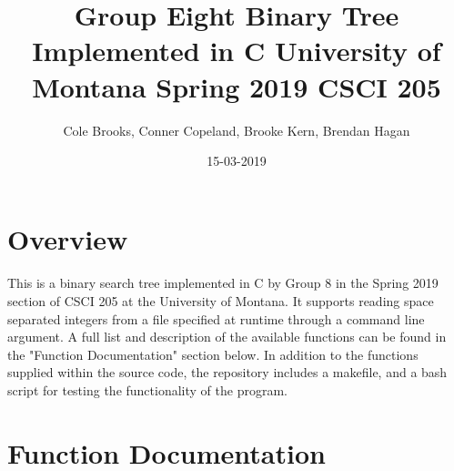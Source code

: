 \documentclass{article}
\title{Group Eight Binary Tree Implemented in C University of Montana Spring 2019 CSCI 205}
\date{15-03-2019}
\author{Cole Brooks, Conner Copeland, Brooke Kern, Brendan Hagan}
\begin{document}
\maketitle
{}
\newpage
{}
\newpage
{}

\section{Overview}
\paragraph{}
This is a binary search tree implemented in C by Group 8 in the Spring 2019 section of CSCI 205 at the University of Montana. It supports reading space separated integers from a file specified at runtime through a command line argument. A full list and description of the available functions can be found in the "Function Documentation" section below. In addition to the functions supplied within the source code, the repository includes a makefile, and a bash script for testing the functionality of the program.

\section{Function Documentation}
\end{document}
